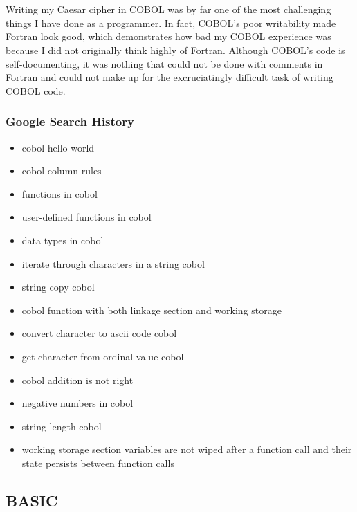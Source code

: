 \documentclass[letterpaper, 10pt, DIV=13]{scrartcl}
\numberwithin{equation}{section}
\numberwithin{figure}{section}
\numberwithin{table}{section}
\begin{document}
\\ \\
Writing my Caesar cipher in COBOL was by far one of the most challenging things I have done as a programmer. In fact, COBOL's poor writability made Fortran look good, which demonstrates how bad my COBOL experience was because I did not originally think highly of Fortran. Although COBOL's code is self-documenting, it was nothing that could not be done with comments in Fortran and could not make up for the excruciatingly difficult task of writing COBOL code.

\subsubsection{Google Search History}
\begin{itemize}
	\item cobol hello world
	\item cobol column rules
	\item functions in cobol
	\item user-defined functions in cobol
	\item data types in cobol
	\item iterate through characters in a string cobol
	\item string copy cobol
	\item cobol function with both linkage section and working storage
	\item convert character to ascii code cobol
	\item get character from ordinal value cobol
	\item cobol addition is not right
	\item negative numbers in cobol
	\item string length cobol
	\item working storage section variables are not wiped after a function call and their state persists between function calls
\end{itemize}

\subsection{BASIC}
\end{document}
